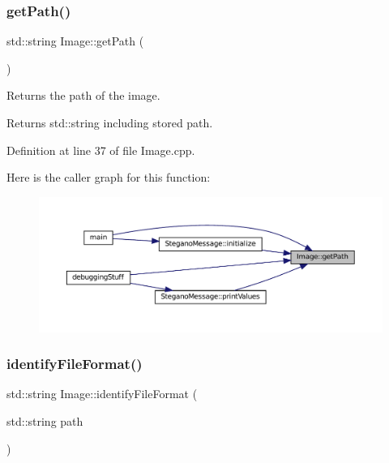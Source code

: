 \subsubsection{\texorpdfstring{getPath()}{getPath()}}
{\footnotesize\ttfamily std\+::string Image\+::get\+Path (\begin{DoxyParamCaption}{ }\end{DoxyParamCaption})}



Returns the path of the image. 

\begin{DoxyReturn}{Returns}
std\+::string including stored path. 
\end{DoxyReturn}


Definition at line 37 of file Image.\+cpp.

Here is the caller graph for this function\+:
\nopagebreak
\begin{figure}[H]
\begin{center}
\leavevmode
\includegraphics[width=350pt]{classImage_a885989eb723cb0a1fc0555c7e8de817e_icgraph}
\end{center}
\end{figure}
\mbox{\label{classImage_ac4e8db14cfd60a6a7085e6fcb83488a4}} 
\subsubsection{\texorpdfstring{identifyFileFormat()}{identifyFileFormat()}}
{\footnotesize\ttfamily std\+::string Image\+::identify\+File\+Format (\begin{DoxyParamCaption}\item[{std\+::string}]{path }\end{DoxyParamCaption})\hspace{0.3cm}{\ttfamily [static]}}



